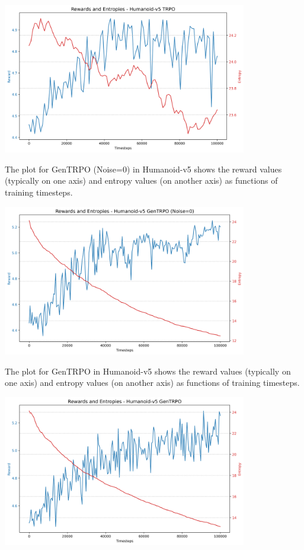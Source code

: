 \documentclass{svproc}
\begin{document}
\begin{center}
\includegraphics[width=0.8\textwidth]{graph_Humanoid-v5_trpo_rewards_entropies.png}
\end{center}

The plot for GenTRPO (Noise=0) in Humanoid-v5 shows the reward values (typically on one axis) and entropy values (on another axis) as functions of training timesteps.

\begin{center}
\includegraphics[width=0.8\textwidth]{graph_Humanoid-v5_gentrpo_rewards_entropies.png}
\end{center}

The plot for GenTRPO in Humanoid-v5 shows the reward values (typically on one axis) and entropy values (on another axis) as functions of training timesteps.

\begin{center}
\includegraphics[width=0.8\textwidth]{graph_Humanoid-v5_gentrpo-ne_rewards_entropies.png}
\end{center}
\end{document}
